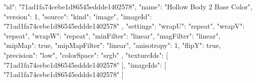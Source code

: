 {
  "id": "71ad1fa74cebe1d86545eddde1402578",
  "name": "Hollow Body 2 Base Color",
  "version": 1,
  "source": {
    "kind": "image",
    "imageId": "71ad1fa74cebe1d86545eddde1402578"
  },
  "settings": {
    "wrapU": "repeat",
    "wrapV": "repeat",
    "wrapW": "repeat",
    "minFilter": "linear",
    "magFilter": "linear",
    "mipMap": true,
    "mipMapFilter": "linear",
    "anisotropy": 1,
    "flipY": true,
    "precision": "low",
    "colorSpace": "srgb"
  },
  "textureIds": [
    "71ad1fa74cebe1d86545eddde1402578"
  ],
  "imageIds": [
    "71ad1fa74cebe1d86545eddde1402578"
  ]
}
